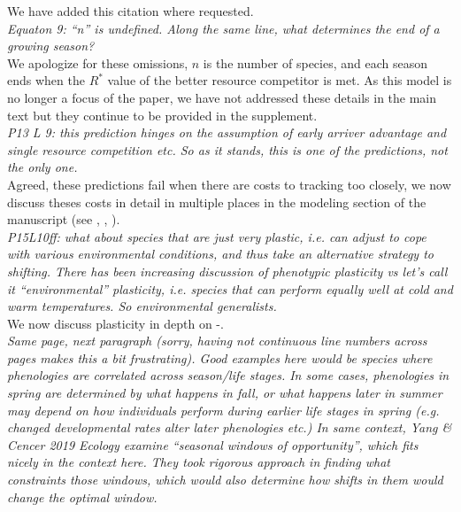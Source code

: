 \documentclass[11pt]{article}
\begin{document}
We have added this citation where requested.\\

\emph{Equaton 9: ``n'' is undefined. Along the same line, what determines the end of a growing
season?}\\

We apologize for these omissions, $n$ is the number of species, and each season ends when the $R^*$ value of the better resource competitor is met. As this model is no longer a focus of the paper, we have not addressed these details in the main text but they continue to be provided in the supplement.\\

\emph{P13 L 9: this prediction hinges on the assumption of early arriver advantage and single
resource competition etc. So as it stands, this is one of the predictions, not the only one.}\\

Agreed, these predictions fail when there are costs to tracking too closely, we now discuss theses costs in detail in multiple places in the modeling section of the manuscript (see , , ).\\

\emph{P15L10ff: what about species that are just very plastic, i.e. can adjust to cope with various
environmental conditions, and thus take an alternative strategy to shifting. There has been
increasing discussion of phenotypic plasticity vs let's call it ``environmental''  plasticity,
i.e. species that can perform equally well at cold and warm temperatures. So environmental
generalists.}\\

We now discuss plasticity in depth on -. \\

\emph{Same page, next paragraph (sorry, having not continuous line numbers across pages makes this a bit frustrating). Good examples here would be species where phenologies are correlated
across season/life stages. In some cases, phenologies in spring are determined by what
happens in fall, or what happens later in summer may depend on how individuals perform during
earlier life stages in spring (e.g. changed developmental rates alter later phenologies etc.)
In same context, Yang \& Cencer 2019 Ecology examine ``seasonal windows of opportunity'', which
fits nicely in the context here. They took rigorous approach in finding what constraints
those windows, which would also determine how shifts in them would change the optimal window.}\\
\end{document}
